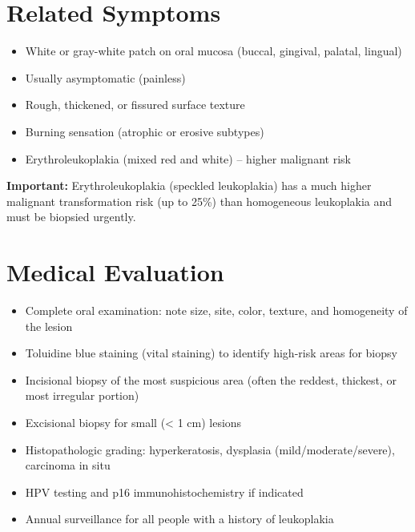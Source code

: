 \section*{Related Symptoms}
\begin{itemize}
  \item White or gray-white patch on oral mucosa (buccal, gingival, palatal, lingual)
  \item Usually asymptomatic (painless)
  \item Rough, thickened, or fissured surface texture
  \item Burning sensation (atrophic or erosive subtypes)
  \item Erythroleukoplakia (mixed red and white) -- higher malignant risk
\end{itemize}
\textbf{Important:} Erythroleukoplakia (speckled leukoplakia) has a much higher malignant transformation risk (up to 25\%) than homogeneous leukoplakia and must be biopsied urgently.

\section*{Medical Evaluation}
\begin{itemize}
  \item Complete oral examination: note size, site, color, texture, and homogeneity of the lesion
  \item Toluidine blue staining (vital staining) to identify high-risk areas for biopsy
  \item Incisional biopsy of the most suspicious area (often the reddest, thickest, or most irregular portion)
  \item Excisional biopsy for small (< 1 cm) lesions
  \item Histopathologic grading: hyperkeratosis, dysplasia (mild/moderate/severe), carcinoma in situ
  \item HPV testing and p16 immunohistochemistry if indicated
  \item Annual surveillance for all people with a history of leukoplakia
\end{itemize}

